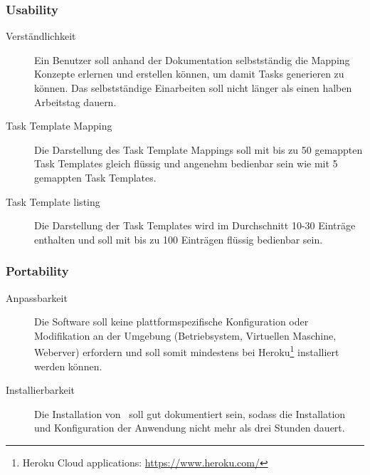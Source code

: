 		\subsubsection{Usability}
		\begin{description}
			\item[Verständlichkeit] Ein Benutzer soll anhand der Dokumentation selbstständig die Mapping Konzepte erlernen und erstellen können, um damit Tasks generieren zu können. Das selbstständige Einarbeiten soll nicht länger als einen halben Arbeitstag dauern.
			\item[Task Template Mapping] Die Darstellung des Task Template Mappings soll mit bis zu 50 gemappten Task Templates gleich flüssig und angenehm bedienbar sein wie mit 5 gemappten Task Templates.
			\item[Task Template listing] Die Darstellung der Task Templates wird im Durchschnitt 10-30 Einträge enthalten und soll mit bis zu 100 Einträgen flüssig bedienbar sein.
		\end{description}

		
		\subsubsection{Portability}
		\begin{description}
			\item[Anpassbarkeit] Die Software soll keine plattformspezifische Konfiguration oder Modifikation an der Umgebung (Betriebsystem, Virtuellen Maschine, Weberver) erfordern und soll somit mindestens bei Heroku\footnote{Heroku Cloud applications: \url{https://www.heroku.com/}} installiert werden können.
			\item[Installierbarkeit] Die Installation von \eeppi\ soll gut dokumentiert sein, sodass die Installation und Konfiguration der Anwendung nicht mehr als drei Stunden dauert.
		\end{description}